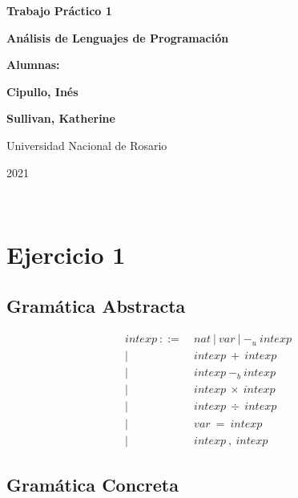 \documentclass[11pt]{article}
\begin{document}
\begin{titlepage}
    \begin{center}
        \vfill
        \vfill
            \vspace{0.7cm}
            \noindent\textbf{\Huge Trabajo Práctico 1}\par
            \noindent\textbf{\Huge Análisis de Lenguajes de Programación}\par
            \vspace{.5cm}
        \vfill
        \noindent \textbf{\huge Alumnas:}\par
        \vspace{.5cm}
        \noindent \textbf{\Large Cipullo, Inés}\par
        \noindent \textbf{\Large Sullivan, Katherine}\par
 
        \vfill
        \large Universidad Nacional de Rosario \par
        \noindent\large 2021
    \end{center}
\end{titlepage}
\ \par




\section*{Ejercicio 1}

\subsection{Gramática Abstracta}

\begin{align*}
    intexp\ ::=\ & nat\ |\ var\ |\ -_u\ intexp \\
            |\ \ & intexp\ +\ intexp \\ 
            |\ \ & intexp\ -_b\ intexp \\ 
            |\ \ & intexp\ \times\ intexp \\ 
            |\ \ & intexp\ \div\ intexp \\ 
            |\ \ & var\ =\ intexp \\
            |\ \ & intexp\ ,\ intexp
\end{align*}

\subsection{Gramática Concreta}
\end{document}
